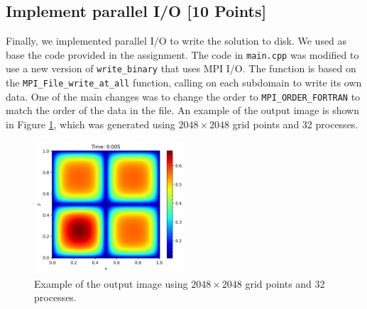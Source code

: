\documentclass[unicode,11pt,a4paper,oneside,numbers=endperiod,openany]{scrartcl}
\begin{document}
\subsection{Implement parallel I/O [10 Points]}
Finally, we implemented parallel I/O to write the solution to disk. We used as
base the code provided in the assignment. The code in \texttt{main.cpp} was
modified to use a new version of \texttt{write\_binary} that uses MPI I/O. The
function is based on the \texttt{MPI\_File\_write\_at\_all} function, calling on
each subdomain to write its own data. One of the main changes was to change the
order to \texttt{MPI\_ORDER\_FORTRAN} to match the order of the data in the
file.
An example of the output image is shown in Figure \ref{fig:output}, which was
generated using $2048 \times 2048$ grid points and 32 processes.
\begin{figure}[h]
    \centering
    \includegraphics[width=0.5\textwidth]{../mini_app_mpi/output.png}
    \caption{Example of the output image using $2048 \times 2048$ grid points and 32 processes.}
    \label{fig:output}
\end{figure}
\end{document}
